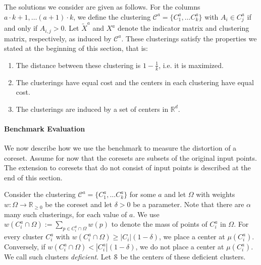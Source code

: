 The solutions we consider are given as follows. For the columns $a\cdot k+1,\ldots (a+1)\cdot k$, we define the clustering $\mathcal{C}^{a} = \{C_1^a,\ldots C_k^a\}$ with 
$A_i\in C_j^a$ if and only if $A_{i,j} > 0$. Let $\tilde X^a$ and $X^{a}$ denote the indicator matrix and clustering matrix, respectively, as induced by $\mathcal{C}^{a}$.
These clusterings satisfy the properties we stated at the beginning of this section, that is:
\begin{enumerate}
\item The distance between these clustering is $1-\frac{1}{k}$, i.e. it is maximized.
\item The clusterings have equal cost and the centers in each clustering have equal cost.
\item The clusterings are induced by a set of centers in $\mathbb{R}^d$.
\end{enumerate}



\paragraph*{Benchmark Evaluation}

We now describe how we use the benchmark to measure the distortion of a coreset. Assume for now that the coresets are subsets of the original input points. The extension to coresets that do not consist of input points is described at the end of this section.

Consider the clustering $\mathcal{C}^{a} = \{C_1^a,\ldots C_k^a\}$ for some $a$ and let $\Omega$ with weights $w:\Omega\rightarrow \mathbb{R}_{\geq 0}$ be the coreset and let $\delta>0$ be a parameter. 
Note that there are $\alpha$ many such clusterings, for each value of $a$.
We use $w(C_i^a \cap \Omega):=\sum_{p\in C_i^a \cap \Omega} w(p)$ to denote the mass of points of $C_i^a$ in $\Omega$.
For every cluster $C_i^a$ with $w(C_i^a \cap \Omega)\geq |C_i| (1-\delta)$, we place a center at $\mu(C_i^a)$. Conversely, if $w(C_i^a \cap \Omega)< |C_i^a| (1-\delta)$, we do not place a center at $\mu(C_i^a)$. We call such clusters \emph{deficient}. Let $\mathcal{S}$ be the centers of these deficient clusters.

